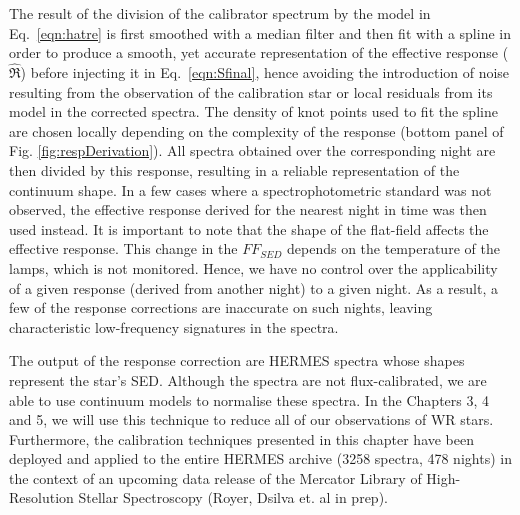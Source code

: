 The result of the division of the calibrator spectrum by the model in Eq.~\ref{eqn:hatre} is first smoothed with a median filter and then fit with a spline in order to produce a smooth, yet accurate representation of the effective response ($\hat{\Re}$) before injecting it in Eq.~\ref{eqn:Sfinal}, hence avoiding the introduction of noise resulting from the observation of the calibration star or local residuals from its model in the corrected spectra. The density of knot points used to fit the spline are chosen locally depending on the complexity of the response (bottom panel of Fig. \ref{fig:respDerivation}). All spectra obtained over the corresponding night are then divided by this response, resulting in a reliable representation of the continuum shape. 
In a few cases where a spectrophotometric standard was not observed, the effective response derived for the nearest night in time was then used instead. It is important to note that the shape of the flat-field affects the effective response. This change in the $FF_{SED}$ depends on the temperature of the lamps, which is not monitored. Hence, we have no control over the applicability of a given response (derived from another night) to a given night. As a result, a few of the response corrections are inaccurate on such nights, leaving characteristic low-frequency signatures in the spectra. 

The output of the response correction are HERMES spectra whose shapes represent the star's SED. Although the spectra are not flux-calibrated, we are able to use continuum models to normalise these spectra. In the Chapters 3, 4 and 5, we will use this technique to reduce all of our observations of WR stars. Furthermore, the calibration techniques presented in this chapter have been deployed and applied to the entire HERMES archive (3258 spectra, 478 nights) in the context of an upcoming data release of the Mercator Library of High-Resolution Stellar Spectroscopy (Royer, Dsilva et. al in prep). 





